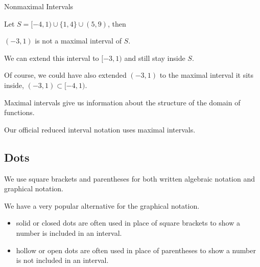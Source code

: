 \documentclass{ximera}
\begin{document}
\begin{example} Nonmaximal Intervals 

Let $S = [-4, 1) \cup \{ 1, 4 \} \cup (5, 9)$, then


$(-3, 1)$ is not a maximal interval of $S$.

We can extend this interval to $[-3, 1)$ and still stay inside $S$.


\end{example}
Of course, we could have also extended $(-3, 1)$ to the maximal interval it sits inside, $(-3, 1) \subset [-4, 1)$. 

Maximal intervals give us information about the structure of the domain of functions.


Our official reduced interval notation uses maximal intervals.

























\subsection*{Dots}

\hfill\break












We use square brackets and parentheses for both written algebraic notation and graphical notation.  


We have a very popular alternative for the graphical notation. 


\begin{itemize}
    \item solid or closed dots are often used in place of square brackets to show a number is included in an interval.
    \item hollow or open dots are often used in place of parentheses to show a number is not included in an interval.
\end{itemize}
\end{document}
